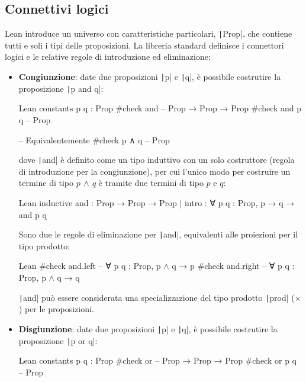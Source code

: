 \subsection{Connettivi logici}
Lean introduce un universo con caratteristiche particolari, \texttt|Prop|, che contiene tutti e soli i tipi delle proposizioni. La libreria standard definisce i connettori logici e le relative regole di introduzione ed eliminazione:
\begin{itemize}
    \item 
        \textbf{Congiunzione}: date due proposizioni \texttt|p| e \texttt|q|, è possibile costrutire la proposizione \texttt|p and q|:
        \begin{code}{Lean}
constants p q : Prop
#check and -- Prop → Prop → Prop
#check and p q -- Prop

-- Equivalentemente
#check p ∧ q -- Prop
        \end{code}
        dove \texttt|and| è definito come un tipo induttivo con un solo costruttore (regola di introduzione per la congiunzione), per cui l'unico modo per costruire un termine di tipo $p\,\wedge\,q$ è tramite due termini di tipo $p$ e $q$:
        \begin{code}{Lean}
inductive and : Prop → Prop → Prop
| intro : ∀ {p q : Prop}, p → q → and p q
        \end{code}
        Sono due le regole di eliminazione per \texttt|and|, equivalenti alle proiezioni per il tipo prodotto:
        \begin{code}{Lean}
#check and.left -- ∀ {p q : Prop}, p $\wedge$ q → p
#check and.right -- ∀ {p q : Prop}, p $\wedge$ q → q
        \end{code}
    
    \texttt|and| può essere considerata una specializzazione del tipo prodotto \texttt|prod| ($\times$) per le proposizioni.
    
    \item 
        \textbf{Disgiunzione}: date due proposizioni \texttt|p| e \texttt|q|, è possibile costrutire la proposizione \texttt|p or q|:
        \begin{code}{Lean}
constants p q : Prop
#check or -- Prop → Prop → Prop
#check or p q -- Prop


\end{code}
\end{itemize}
